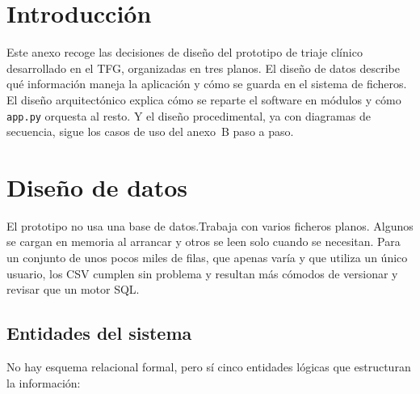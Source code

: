 
\section{Introducción}

Este anexo recoge las decisiones de diseño del prototipo de triaje clínico desarrollado en el TFG, organizadas en tres planos. El diseño de datos describe qué información maneja la aplicación y cómo se guarda en el sistema de ficheros. El diseño arquitectónico explica cómo se reparte el software en módulos y cómo \texttt{app.py} orquesta al resto. Y el diseño procedimental, ya con diagramas de secuencia, sigue los casos de uso del anexo~B paso a paso.


\section{Diseño de datos}

El prototipo no usa una base de datos.Trabaja con varios ficheros planos. Algunos se cargan en memoria al arrancar y otros se leen solo cuando se necesitan. Para un conjunto de unos pocos miles de filas, que apenas varía y que utiliza un único usuario, los CSV cumplen sin problema y resultan más cómodos de versionar y revisar que un motor SQL.

\subsection*{Entidades del sistema}

No hay esquema relacional formal, pero sí cinco entidades lógicas que estructuran la información:

